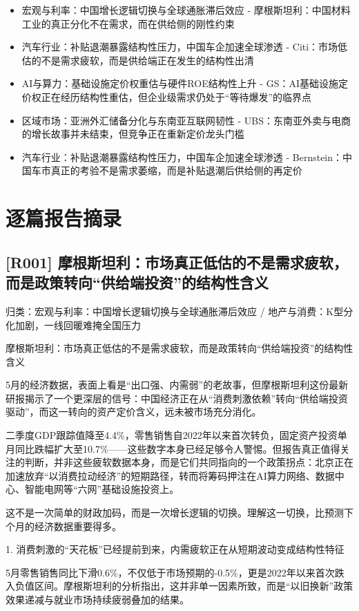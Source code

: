 \documentclass[11pt]{ctexart}
\begin{document}
\begin{itemize}
  \item [R027] 宏观与利率：中国增长逻辑切换与全球通胀滞后效应 - 摩根斯坦利：中国材料工业的真正分化不在需求，而在供给侧的刚性约束
  \item [R028] 汽车行业：补贴退潮暴露结构性压力，中国车企加速全球渗透 - Citi：市场低估的不是需求疲软，而是供给端正在发生的结构性出清
  \item [R029] AI与算力：基础设施定价权重估与硬件ROE结构性上升 - GS：AI基础设施定价权正在经历结构性重估，但企业级需求仍处于“等待爆发”的临界点
  \item [R030] 区域市场：亚洲外汇储备分化与东南亚互联网韧性 - UBS：东南亚外卖与电商的增长故事并未结束，但竞争正在重新定价龙头门槛
  \item [R031] 汽车行业：补贴退潮暴露结构性压力，中国车企加速全球渗透 - Bernstein：中国车市真正的考验不是需求萎缩，而是补贴退潮后供给侧的再定价
\end{itemize}
\section{逐篇报告摘录}
\subsection{[R001] 摩根斯坦利：市场真正低估的不是需求疲软，而是政策转向“供给端投资”的结构性含义}
{\small\color{refgray}归类：宏观与利率：中国增长逻辑切换与全球通胀滞后效应 / 地产与消费：K型分化加剧，一线回暖难掩全国压力}

摩根斯坦利：市场真正低估的不是需求疲软，而是政策转向“供给端投资”的结构性含义

5月的经济数据，表面上看是“出口强、内需弱”的老故事，但摩根斯坦利这份最新研报揭示了一个更深层的信号：中国经济正在从“消费刺激依赖”转向“供给端投资驱动”，而这一转向的资产定价含义，远未被市场充分消化。

二季度GDP跟踪值降至4.4\%，零售销售自2022年以来首次转负，固定资产投资单月同比跌幅扩大至10.7\%——这些数字本身已经足够令人警惕。但报告真正值得关注的判断，并非这些疲软数据本身，而是它们共同指向的一个政策拐点：北京正在加速放弃“以消费拉动经济”的短期路径，转而将筹码押注在AI算力网络、数据中心、智能电网等“六网”基础设施投资上。

这不是一次简单的财政加码，而是一次增长逻辑的切换。理解这一切换，比预测下个月的经济数据重要得多。

1. 消费刺激的“天花板”已经提前到来，内需疲软正在从短期波动变成结构性特征

5月零售销售同比下滑0.6\%，不仅低于市场预期的-0.5\%，更是2022年以来首次跌入负值区间。摩根斯坦利的分析指出，这并非单一因素所致，而是“以旧换新”政策效果递减与就业市场持续疲弱叠加的结果。
\end{document}

